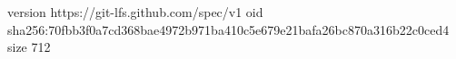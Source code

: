 version https://git-lfs.github.com/spec/v1
oid sha256:70fbb3f0a7cd368bae4972b971ba410c5e679e21bafa26bc870a316b22c0ced4
size 712
